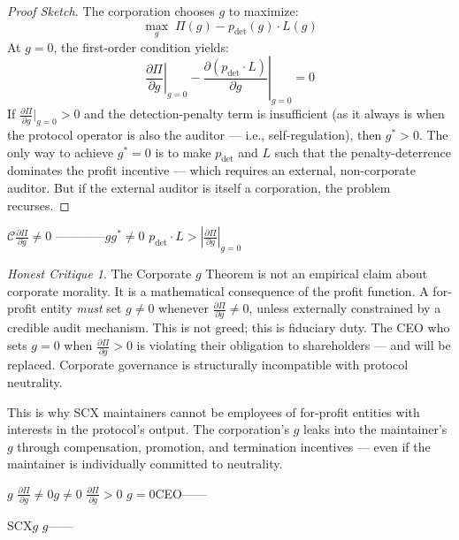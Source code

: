 \documentclass[12pt,a4paper]{article}
\theoremstyle{remark}
\newtheorem{honesthit}{Honest Critique}[section]
\newenvironment{hitbox}{%
  \begin{center}
  \color{red}
  \begin{minipage}{0.92\textwidth}
  \begin{honesthit}
}{%
  \end{honesthit}
  \end{minipage}
  \end{center}
}
\begin{document}
\begin{proof}[Proof Sketch]
The corporation chooses $g$ to maximize:
\begin{equation}
    \max_{g} \; \Pi(g) - p_{\text{det}}(g) \cdot L(g)
\end{equation}
At $g = 0$, the first-order condition yields:
\begin{equation}
    \left.\frac{\partial \Pi}{\partial g}\right|_{g=0} - 
    \left.\frac{\partial(p_{\text{det}} \cdot L)}{\partial g}\right|_{g=0} = 0
\end{equation}
If $\frac{\partial \Pi}{\partial g}|_{g=0} > 0$ and the detection-penalty term is
insufficient (as it always is when the protocol operator is also the auditor —
i.e., self-regulation), then $g^* > 0$. The only way to achieve $g^* = 0$ is to
make $p_{\text{det}}$ and $L$ such that the penalty-deterrence dominates the
profit incentive — which requires an external, non-corporate auditor. But if the
external auditor is itself a corporation, the problem recurses.
\end{proof}

\noindent\textbf{}
$\mathcal{C}$$\frac{\partial \Pi}{\partial g} \neq 0$
————$g$$g^* \neq 0$
$p_{\text{det}} \cdot L > |\frac{\partial \Pi}{\partial g}|_{g=0}$

\begin{hitbox}
The Corporate $g$ Theorem is not an empirical claim about corporate morality.
It is a mathematical consequence of the profit function. A for-profit entity
\textit{must} set $g \neq 0$ whenever $\frac{\partial \Pi}{\partial g} \neq 0$,
unless externally constrained by a credible audit mechanism. This is not greed;
this is fiduciary duty. The CEO who sets $g = 0$ when $\frac{\partial \Pi}{\partial g} > 0$
is violating their obligation to shareholders — and will be replaced. Corporate
governance is structurally incompatible with protocol neutrality.

This is why SCX maintainers cannot be employees of for-profit entities with
interests in the protocol's output. The corporation's $g$ leaks into the
maintainer's $g$ through compensation, promotion, and termination incentives —
even if the maintainer is individually committed to neutrality.

\begin{center}
\small\textbf{}
$g$
$\frac{\partial \Pi}{\partial g} \neq 0$\textit{}$g \neq 0$
$\frac{\partial \Pi}{\partial g} > 0$
$g = 0$CEO——

SCX$g$
$g$——
\end{center}
\end{hitbox}
\end{document}
